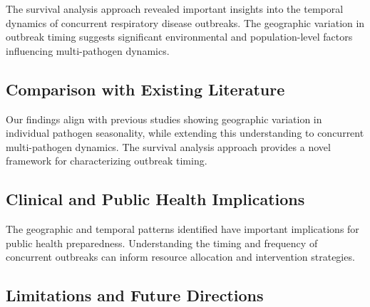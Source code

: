 \documentclass[preprint,12pt]{elsarticle}
\begin{document}
The survival analysis approach revealed important insights into the temporal dynamics of concurrent respiratory disease outbreaks. The geographic variation in outbreak timing suggests significant environmental and population-level factors influencing multi-pathogen dynamics.


\subsection{Comparison with Existing Literature}


Our findings align with previous studies showing geographic variation in individual pathogen seasonality, while extending this understanding to concurrent multi-pathogen dynamics. The survival analysis approach provides a novel framework for characterizing outbreak timing.


\subsection{Clinical and Public Health Implications}


The geographic and temporal patterns identified have important implications for public health preparedness. Understanding the timing and frequency of concurrent outbreaks can inform resource allocation and intervention strategies.


\subsection{Limitations and Future Directions}

\end{document}
